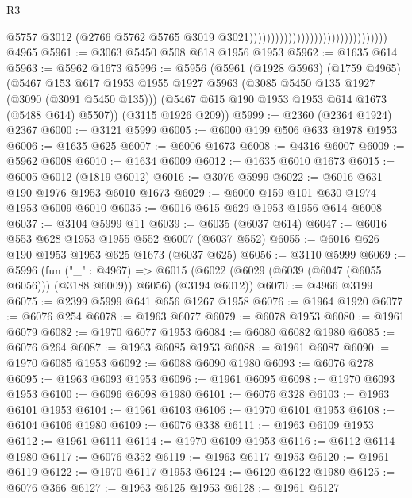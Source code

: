 \begin{lexlean}{R3}
\begin{coremodule}
                                                                  @5757
                                                                  @3012
                                                                  (@2766
                                                                    @5762
                                                                    @5765
                                                                    @3019
                                                                    @3021))))))))))))))))))))))))))))))))
    @4965
@5961 := @3063 @5450 @508 @618 @1956 @1953
@5962 := @1635 @614
@5963 := @5962 @1673
@5996 := @5956
    (@5961
      (@1928 @5963)
      (@1759 @4965)
      (@5467
        @153
        @617
        @1953
        @1955
        @1927
        @5963
        (@3085 @5450 @135 @1927 (@3090 (@3091 @5450 @135)))
        (@5467 @615 @190 @1953 @1953 @614 @1673 (@5488 @614) @5507))
      (@3115 @1926 @209))
@5999 := @2360 (@2364 @1924) @2367
@6000 := @3121 @5999
@6005 := @6000 @199 @506 @633 @1978 @1953
@6006 := @1635 @625
@6007 := @6006 @1673
@6008 := @4316 @6007
@6009 := @5962 @6008
@6010 := @1634 @6009
@6012 := @1635 @6010 @1673
@6015 := @6005 @6012 (@1819 @6012)
@6016 := @3076 @5999
@6022 := @6016 @631 @190 @1976 @1953 @6010 @1673
@6029 := @6000 @159 @101 @630 @1974 @1953 @6009 @6010
@6035 := @6016 @615 @629 @1953 @1956 @614 @6008
@6037 := @3104 @5999 @11
@6039 := @6035 (@6037 @614)
@6047 := @6016 @553 @628 @1953 @1955 @552 @6007 (@6037 @552)
@6055 := @6016 @626 @190 @1953 @1953 @625 @1673 (@6037 @625)
@6056 := @3110 @5999
@6069 := @5996
    (fun ("_" : @4967) =>
    @6015 (@6022 (@6029 (@6039 (@6047 (@6055 @6056))) (@3188 @6009)) @6056) (@3194 @6012))
@6070 := @4966 @3199
@6075 := @2399 @5999 @641 @656 @1267 @1958
@6076 := @1964 @1920
@6077 := @6076 @254
@6078 := @1963 @6077
@6079 := @6078 @1953
@6080 := @1961 @6079
@6082 := @1970 @6077 @1953
@6084 := @6080 @6082 @1980
@6085 := @6076 @264
@6087 := @1963 @6085 @1953
@6088 := @1961 @6087
@6090 := @1970 @6085 @1953
@6092 := @6088 @6090 @1980
@6093 := @6076 @278
@6095 := @1963 @6093 @1953
@6096 := @1961 @6095
@6098 := @1970 @6093 @1953
@6100 := @6096 @6098 @1980
@6101 := @6076 @328
@6103 := @1963 @6101 @1953
@6104 := @1961 @6103
@6106 := @1970 @6101 @1953
@6108 := @6104 @6106 @1980
@6109 := @6076 @338
@6111 := @1963 @6109 @1953
@6112 := @1961 @6111
@6114 := @1970 @6109 @1953
@6116 := @6112 @6114 @1980
@6117 := @6076 @352
@6119 := @1963 @6117 @1953
@6120 := @1961 @6119
@6122 := @1970 @6117 @1953
@6124 := @6120 @6122 @1980
@6125 := @6076 @366
@6127 := @1963 @6125 @1953
@6128 := @1961 @6127

\end{coremodule}
\end{lexlean}
